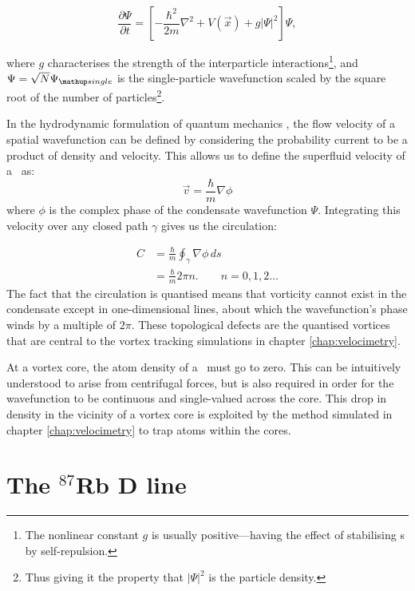 \begin{equation}
\frac{\partial \Psi}{\partial t} = \left[-\frac{\hbar^2}{2m}\nabla^2 + V(\vec{x}) + g|\Psi|^2\right]\Psi,
\end{equation}

where $g$ characterises the strength of the interparticle interactions\footnote{The nonlinear constant $g$ is usually positive---having the effect of stabilising \bec s by self-repulsion.}, and $\Psi = \sqrt{N}\Psi_\up{single}$ is the single-particle wavefunction scaled by the square root of the number of particles\footnote{Thus giving it the property that $|\Psi|^2$ is the particle density.}.

In the hydrodynamic formulation of quantum mechanics \cite{madelung_quantentheorie_1927}, the flow velocity of a spatial wavefunction can be defined by considering the probability current to be a product of density and velocity. This allows us to define the superfluid velocity of a \bec\ as:
\begin{equation}
\vec v = \frac\hbar m \nabla\phi
\end{equation}
where $\phi$ is the complex phase of the condensate wavefunction $\Psi$. Integrating this velocity over any closed path $\gamma$ gives us the circulation:

\begin{align}
C &= \frac\hbar m\oint_\gamma\nabla\phi\,ds\\
  &= \frac\hbar m 2\pi n.\qquad n=0,1,2\dots
\end{align}
The fact that the circulation is quantised means that vorticity cannot exist in the condensate except in one-dimensional lines, about which the wavefunction's phase winds by a multiple of $2\pi$. These topological defects are the quantised vortices that are central to the vortex tracking simulations in chapter \ref{chap:velocimetry}.

At a vortex core, the atom density of a \bec\ must go to zero. This can be intuitively understood to arise from centrifugal forces, but is also required in order for the wavefunction to be continuous and single-valued across the core. This drop in density in the vicinity of a vortex core is exploited by the method simulated in chapter \ref{chap:velocimetry} to trap atoms within the cores.

\section{The $^{87}$Rb D line}\label{sec:the_rubidium_D_line}

